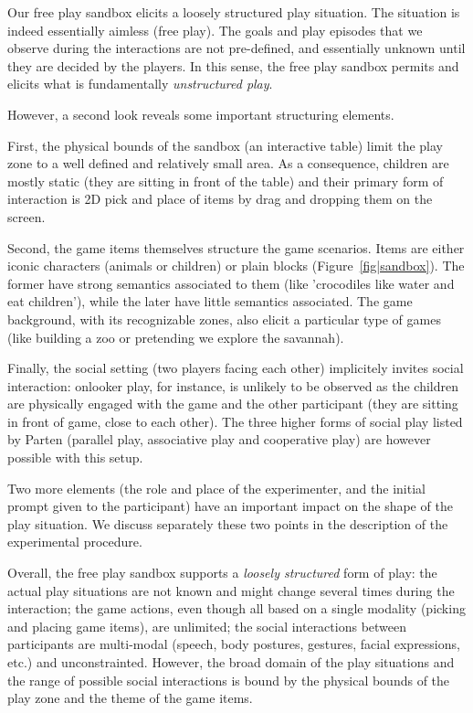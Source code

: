 \documentclass[a4paper]{article}
\begin{document}
Our free play sandbox elicits a loosely structured play situation. The
situation is indeed essentially aimless (free play). The goals and play episodes
that we observe during the interactions are not pre-defined, and essentially
unknown until they are decided by the players. In this sense, the free play
sandbox permits and elicits what is fundamentally \emph{unstructured play}.

However, a second look reveals some important structuring elements.

First, the physical bounds of the sandbox (an interactive table) limit the
play zone to a well defined and relatively small area. As a consequence,
children are mostly static (they are sitting in front of the table) and their
primary form of interaction is 2D pick and place of items by drag and dropping
them on the screen.

Second, the game items themselves structure the game scenarios. Items are either
iconic characters (animals or children) or plain blocks
(Figure~\ref{fig|sandbox}). The former have strong semantics associated to them
(like 'crocodiles like water and eat children'), while the later have little
semantics associated. The game background, with its recognizable zones, also
elicit a particular type of games (like building a zoo or pretending we explore
the savannah).

Finally, the social setting (two players facing each other) implicitely invites
social interaction: onlooker play, for instance, is unlikely to be observed as
the children are physically engaged with the game and the other participant
(they are sitting in front of game, close to each other). The three higher forms
of social play listed by Parten (parallel play, associative play and cooperative
play) are however possible with this setup.


Two more elements (the role and place of the experimenter, and the initial
prompt given to the participant) have an important impact on the shape of the
play situation. We discuss separately these two points in the description of the
experimental procedure.

Overall, the free play sandbox supports a \emph{loosely structured} form of play: the
actual play situations are not known and might change several times during the
interaction; the game actions, even though all based on a single modality (picking and
placing game items), are unlimited; the social interactions between participants
are multi-modal (speech, body postures, gestures, facial expressions, etc.) and
unconstrainted. However, the broad domain of the play situations and the range of
possible social interactions is bound by the physical bounds of the play zone
and the theme of the game items.
\end{document}
